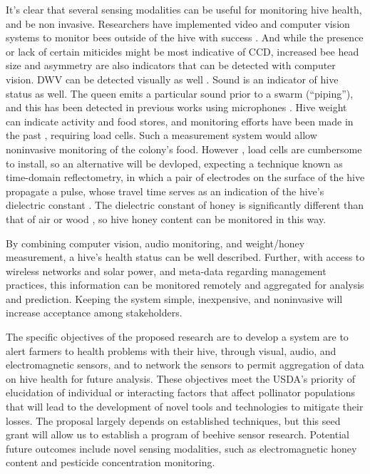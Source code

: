 It's clear that several sensing modalities can be useful for monitoring hive health, and be non invasive. Researchers have implemented video and computer vision systems to monitor bees outside of the hive with success \cite{azarcoya2014automatic,steen2011portable}. And while the presence or lack of certain miticides might be most indicative of CCD, increased bee head size and asymmetry are also indicators \cite{speybroeck2010weighing} that can be detected with computer vision. DWV can be detected visually as well \cite{de2010deformed}. Sound is an indicator of hive status as well. The queen emits a particular sound prior to a swarm (“piping”), and this has been detected in previous works using microphones \cite{ferrari2008monitoring, eren1997electronic}. Hive weight can indicate activity and food stores, and monitoring efforts have been made in the past \cite{meikle2008within}, requiring load cells. Such a measurement system would allow noninvasive monitoring of the colony's food. However , load cells are cumbersome to install, so an alternative will be devloped, expecting a technique known as time-domain reflectometry, in which a pair of electrodes on the surface of the hive propagate a pulse, whose travel time serves as an indication of the hive's dielectric constant \cite{dalton1984time}. The dielectric constant of honey is significantly different than that of air or wood \cite{guo2010sugar}, so hive honey content can be monitored in this way.

By combining computer vision, audio monitoring, and weight/honey measurement,  a hive's health status can be well described. Further, with access to wireless networks and solar power, and meta-data regarding management practices, this information can be monitored remotely and aggregated for analysis and prediction. Keeping the system simple, inexpensive, and noninvasive will increase acceptance among stakeholders.

The specific objectives of the proposed research are to develop a system are to alert farmers to health problems with their hive, through visual, audio, and electromagnetic sensors, and to network the sensors to permit aggregation of data on hive health for future analysis. These objectives meet the USDA's priority of elucidation of individual or interacting factors that affect pollinator populations that will lead to the development of novel tools and technologies to mitigate their losses. The proposal largely depends on established techniques, but this seed grant will allow us to establish a program of beehive sensor research. Potential future outcomes include novel sensing modalities, such as electromagnetic honey content and pesticide concentration monitoring.


